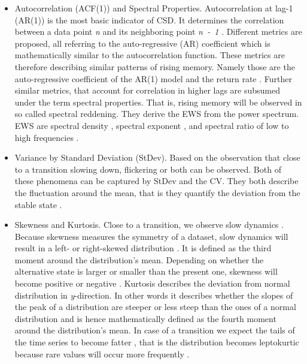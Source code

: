 \begin{itemize}
	\item Autocorrelation (ACF(1)) and Spectral Properties. Autocorrelation at lag-1 (AR(1)) is the most basic indicator of CSD. It determines the correlation between a data point \textit{n} and its neighboring point \textit{n~-~1} \citep{carpenter2008}. Different metrics are proposed, all referring to the auto-regressive (AR) coefficient which is mathematically similar to the autocorrelation function. These metrics are therefore describing similar patterns of rising memory. Namely those are the auto-regressive coefficient of the AR(1) model \citep{held2004} and the return rate \citep[inverse of AR(1) model][]{carpenter2008}. Further similar metrics, that account for correlation in higher lags are subsumed under the term spectral properties. That is, rising memory will be observed in so called spectral reddening. They derive the EWS from the power spectrum. EWS are spectral density \citep{kleinen2003}, spectral exponent \citep{dakos2012}, and spectral ratio of low to high frequencies \citep{biggs2009}.
	\item Variance by Standard Deviation (StDev). Based on the observation that close to a transition slowing down, \gls{flickering} or both can be observed. Both of these phenomena can be captured by StDev and the CV. They both describe the fluctuation around the mean, that is they quantify the deviation from the stable state \citep{carpenter2006}.
	\item Skewness and Kurtosis. Close to a transition, we observe slow dynamics \citep{scheffer2009b}. Because skewness measures the symmetry of a dataset, slow dynamics will result in a left- or right-skewed distribution \citep{guttal2008}. It is defined as the third moment around the distribution's mean. Depending on whether the alternative state is larger or smaller than the present one, skewness will become positive or negative \citep{dakos2012}. Kurtosis describes the deviation from normal distribution in \textit{y}-direction. In other words it describes whether the slopes of the peak of a distribution are steeper or less steep than the ones of a normal distribution and is hence mathematically defined as the fourth moment around the distribution's mean. In case of a transition we expect the tails of the time series to become fatter \citep{biggs2009}, that is the distribution becomes leptokurtic because rare values will occur more frequently \citep{dakos2012}.
\end{itemize}

